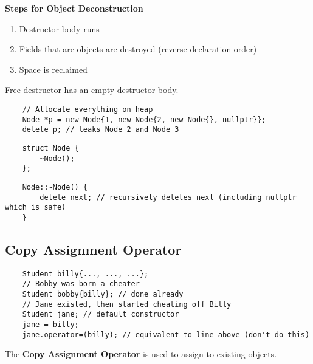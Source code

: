\textbf{Steps for Object Deconstruction}
\begin{enumerate}[(1)]
    \item Destructor body runs
    \item Fields that are objects are destroyed (reverse declaration order)
    \item Space is reclaimed
\end{enumerate}
Free destructor has an empty destructor body.
\begin{lstlisting}
    // Allocate everything on heap
    Node *p = new Node{1, new Node{2, new Node{}, nullptr}};
    delete p; // leaks Node 2 and Node 3
\end{lstlisting}

\begin{lstlisting}
    struct Node {
        ~Node();
    };
\end{lstlisting}
\begin{lstlisting}
    Node::~Node() {
        delete next; // recursively deletes next (including nullptr which is safe)
    }
\end{lstlisting}

\subsection{Copy Assignment Operator}
\begin{lstlisting}
    Student billy{..., ..., ...};
    // Bobby was born a cheater
    Student bobby{billy}; // done already
    // Jane existed, then started cheating off Billy
    Student jane; // default constructor
    jane = billy;
    jane.operator=(billy); // equivalent to line above (don't do this)
\end{lstlisting}
The \textbf{Copy Assignment Operator} is used to assign to existing objects.
